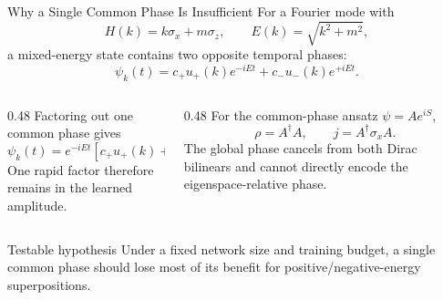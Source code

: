 \documentclass[aspectratio=169,10pt]{beamer}
\begin{document}
\begin{frame}{Why a Single Common Phase Is Insufficient}
For a Fourier mode with
\begin{equation*}
H(k)=k\sigma_x+m\sigma_z,
\qquad E(k)=\sqrt{k^2+m^2},
\end{equation*}
a mixed-energy state contains two opposite temporal phases:
\begin{equation*}
\psi_k(t)=c_+u_+(k)e^{-iEt}+c_-u_-(k)e^{+iEt}.
\end{equation*}

\begin{columns}[T,onlytextwidth]
\begin{column}{0.48\textwidth}
Factoring out one common phase gives
\begin{equation*}
\psi_k(t)=e^{-iEt}
\left[c_+u_+(k)+c_-u_-(k)e^{2iEt}\right].
\end{equation*}
One rapid factor therefore remains in the learned amplitude.
\end{column}
\begin{column}{0.48\textwidth}
For the common-phase ansatz \(\psi=Ae^{iS}\),
\begin{equation*}
\rho=A^\dagger A,
\qquad
j=A^\dagger\sigma_xA.
\end{equation*}
The global phase cancels from both Dirac bilinears and cannot directly encode
the eigenspace-relative phase.
\end{column}
\end{columns}

\begin{alertblock}{Testable hypothesis}
Under a fixed network size and training budget, a single common phase should
lose most of its benefit for positive/negative-energy superpositions.
\end{alertblock}
\end{frame}
\end{document}
